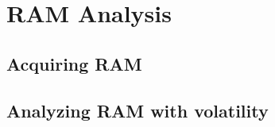 \chapter{RAM Analysis}\label{ch:ram}
\section{Acquiring RAM}
\section{Analyzing RAM with volatility}

